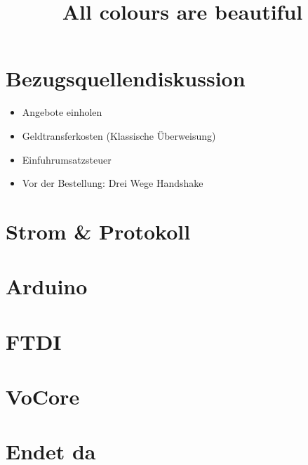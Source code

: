 \documentclass{beamer}
\title{All colours are beautiful}
\institute{MetaMeute}
\begin{document}
\begin{frame}
 \maketitle
\end{frame}

\section{Bezugsquellendiskussion}
\begin{frame}
\begin{itemize}
 \item Angebote einholen
 \item Geldtransferkosten (Klassische Überweisung)
 \item Einfuhrumsatzsteuer
 \item Vor der Bestellung: Drei Wege Handshake
\end{itemize}
\end{frame}

\section{Strom \& Protokoll}
\begin{frame}
\end{frame}


\section{Arduino}
\begin{frame}
\end{frame}

\section{FTDI}
\begin{frame}
\end{frame}


\section{VoCore}
\begin{frame}
\end{frame}

\section{Endet da}
\begin{frame}
\end{frame}
\end{document}
